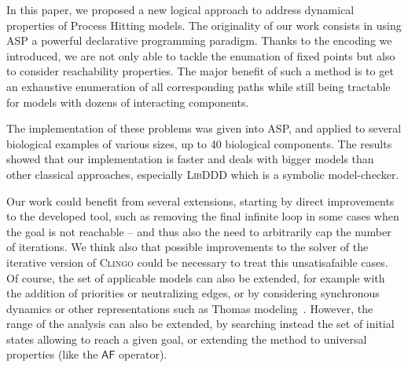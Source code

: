 In this paper, we proposed a new logical approach to address dynamical properties of Process Hitting models. The originality of our work consists in using ASP a powerful declarative programming paradigm. Thanks to the encoding we introduced, we are not only able to tackle the enumation of fixed points but also to consider reachability properties. The major benefit of such a method is to get an exhaustive enumeration of all corresponding paths while still being tractable for models with dozens of interacting components.

The implementation of these problems was given into ASP,
and applied to several biological examples of various sizes, up to
40 biological components.
The results showed that our implementation is faster and deals with bigger models
than other classical approaches, especially \textsc{LibDDD} which is a symbolic model-checker.

Our work could benefit from several extensions, 
starting by direct improvements to the developed tool,
such as removing the final infinite loop in some cases when the goal is not reachable --
and thus also the need to arbitrarily cap the number of iterations. We think also that possible improvements to the solver of the iterative version of \textsc{Clingo} could be necessary to treat this unsatisafaible cases.
Of course, the set of applicable models can also be extended,
for example with the addition
of priorities or neutralizing edges,
or by considering synchronous dynamics or other representations
such as Thomas modeling~\cite{BernotSemBRN}.
However, the range of the analysis can also be extended,
by searching instead the set of initial states
allowing to reach a given goal,
or extending the method to universal properties (like the $\mathsf{AF}$ operator).
